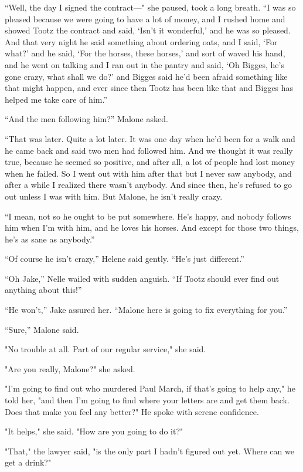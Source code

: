 \documentclass{novel}
\begin{document}
“Well, the day I signed the contract—" she paused, took a long breath. “I was so pleased because we were going to have a lot of money, and I rushed home and showed Tootz the contract and said, ‘Isn’t it wonderful,’ and he was so pleased. And that very night he said something about ordering oats, and I said, ‘For what?’ and he said, ‘For the horses, these horses,’ and sort of waved his hand, and he went on talking and I ran out in the pantry and said, ‘Oh Bigges, he’s gone crazy, what shall we do?’ and Bigges said he’d been afraid something like that might happen, and ever since then Tootz has been like that and Bigges has helped me take care of him.”

“And the men following him?” Malone asked.

“That was later. Quite a lot later. It was one day when he’d been for a walk and he came back and said two men had followed him. And we thought it was really true, because he seemed so positive, and after all, a lot of people had lost money when he failed. So I went out with him after that but I never saw anybody, and after a while I realized there wasn’t anybody. And since then, he’s refused to go out unless I was with him. But Malone, he isn’t really crazy.

“I mean, not so he ought to be put somewhere. He’s happy, and nobody follows him when I’m with him, and he loves his horses. And except for those two things, he’s as sane as anybody.”

“Of course he isn’t crazy,” Helene said gently. “He’s just different.”

“Oh Jake,” Nelle wailed with sudden anguish. “If Tootz should ever find out anything about this!”

“He won’t,” Jake assured her. “Malone here is going to fix everything for you.”

“Sure,” Malone said.

"No trouble at all. Part of our regular service," she said.

"Are you really, Malone?" she asked.

"I’m going to find out who murdered Paul March, if that’s going to help any," he told her, "and then I’m going to find where your letters are and get them back. Does that make you feel any better?" He spoke with serene confidence.

"It helps," she said. "How are you going to do it?"

"That," the lawyer said, "is the only part I hadn't figured out yet. Where can we get a drink?"
\end{document}
